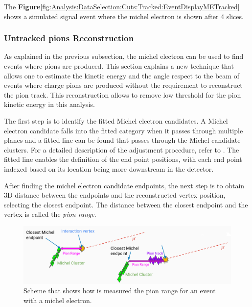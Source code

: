 The \textbf{Figure}\ref{fig:Analysis:DataSelection:Cuts:Tracked:EventDisplayMETracked} shows a simulated signal event where the michel electron is shown after 4 slices. 

\subsubsection{Untracked pions Reconstruction}
\label{Cap:MnvExp:MnvDetector:DataReconstruction:Untrackedpions}

As explained in the previous subsection, the michel electron can be used to find events where pions are produced. This section explains a new technique that allows one to estimate the kinetic energy and the angle respect to the beam of events where charge pions are produced without the requirement to reconstruct the pion track. This reconstruction allows to remove low threshold for the pion kinetic energy in this analysis.
 
The first step is to identify the fitted Michel electron candidates. A Michel electron candidate falls into the fitted category when it passes through multiple planes and a fitted line can be found that passes through the Michel candidate clusters. For a detailed description of the adjustment procedure, refer to \cite{AaronThesis}. The fitted line enables the definition of the end point positions, with each end point indexed based on its location being more downstream in the detector.

After finding the michel electron candidate endpoints, the next step is to obtain 3D distance between the endpoints and the reconstructed vertex position, selecting the closest endpoint. The distance between the closest endpoint and the vertex is called the \textit{pion range}. 

\begin{figure}
    \centering
    \includegraphics[scale=0.33]{Figures/Chapter4/DataSelection/TracklessPions.png}
    \caption{Scheme that shows how is measured the pion range for an event with a michel electron. }
    \label{fig:MnvExp:MnvDetector:DataReconstruction:UntrackedpionsMichelEventSheme}
\end{figure}


